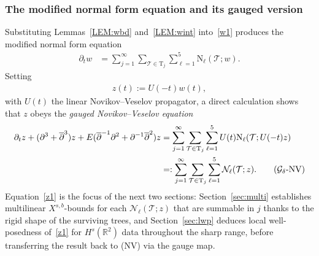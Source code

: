 \documentclass[a4paper,
11pt,  reqno]{amsart}
\newcommand{\5}{\textup{V}}
\newcommand{\dt}{\partial_t}
\theoremstyle{remark}
\newcommand{\R}{\mathbb{R}}
\newcommand{\TT}{\mathcal{T}}
\newcommand{\Tr}{\mathrm{T}}
\renewcommand{\l}{\ell}
\numberwithin{equation}{section}
\numberwithin{theorem}{section}
\newcommand{\NN}{\mathrm{N}}
\newcommand{\Ncal}{\mathcal{N}}
\begin{document}
\subsubsection*{The modified normal form equation and its gauged version}

Substituting Lemmas~\ref{LEM:wbd} and~\ref{LEM:wint} into~\eqref{w1} produces the modified normal form equation
\begin{align}
\label{w2}
\dt w & =  \sum_{j=1}^\infty \sum_{\TT \in \Tr_j} \sum_{\l=1}^5  \NN_\l(\TT;w).
\end{align}
Setting
\begin{align}
\label{z0}
z(t) := U(-t) w(t),
\end{align}
with $U(t)$ the linear Novikov--Veselov propagator, a direct calculation shows that $z$ obeys the \emph{gauged Novikov--Veselov equation}
\begin{align}
\dt z + (\partial^3+\overline{\partial}^3)z + E(\overline{\partial}^{-1}\partial^2 + \partial^{-1}\overline{\partial}^2)z
&= \sum_{j=1}^\infty \sum_{\TT \in \Tr_j} \sum_{\l=1}^5  U(t) \NN_\l(\TT;U(-t)z)
\nonumber\\
&=: \sum_{j=1}^\infty \sum_{\TT \in \Tr_j} \sum_{\l=1}^5  \Ncal_\l(\TT;z).\label{z1}\tag{$\mathcal{G}_\delta$-NV}
\end{align}
Equation~\eqref{z1} is the focus of the next two sections: Section~\ref{sec:multi} establishes multilinear $X^{s,b}$-bounds for each $\Ncal_\l(\TT;z)$ that are summable in $j$ thanks to the rigid shape of the surviving trees, and Section~\ref{sec:lwp} deduces local well-posedness of~\eqref{z1} for $H^s(\R^2)$ data throughout the sharp range, before transferring the result back to (NV) via the gauge map.


%
\end{document}
